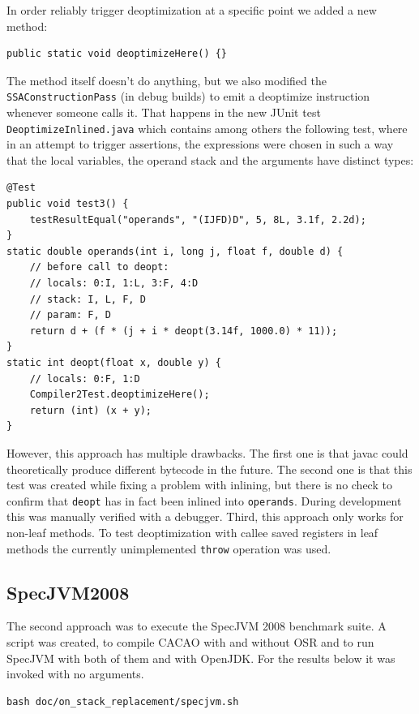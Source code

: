 \documentclass[draft,final]{vutinfth} %
\begin{document}
    In order reliably trigger deoptimization at a specific point we added a new method:

    \begin{lstlisting}
public static void deoptimizeHere() {}
    \end{lstlisting}

    The method itself doesn't do anything,
    but we also modified the \lstinline{SSAConstructionPass} (in debug builds)
    to emit a deoptimize instruction whenever someone calls it.
    That happens in the new JUnit test \lstinline{DeoptimizeInlined.java} which contains among others the following test,
    where in an attempt to trigger assertions,
    the expressions were chosen in such a way that the local variables, the operand stack and the arguments
    have distinct types:
    \begin{lstlisting}
@Test
public void test3() {
    testResultEqual("operands", "(IJFD)D", 5, 8L, 3.1f, 2.2d);
}
static double operands(int i, long j, float f, double d) {
    // before call to deopt:
    // locals: 0:I, 1:L, 3:F, 4:D
    // stack: I, L, F, D
    // param: F, D
    return d + (f * (j + i * deopt(3.14f, 1000.0) * 11));
}
static int deopt(float x, double y) {
    // locals: 0:F, 1:D
    Compiler2Test.deoptimizeHere();
    return (int) (x + y);
}
    \end{lstlisting}

    However, this approach has multiple drawbacks.
    The first one is that javac could theoretically produce different bytecode in the future.
    The second one is that this test was created while fixing a problem with inlining,
    but there is no check to confirm that \lstinline{deopt}
    has in fact been inlined into \lstinline{operands}.
    During development this was manually verified with a debugger.
    Third, this approach only works for non-leaf methods.
    To test deoptimization with callee saved registers in leaf methods the currently unimplemented \lstinline{throw} operation was used.

    \subsection{SpecJVM2008}

    The second approach was to execute the SpecJVM 2008\cite{specjvm2008} benchmark suite.
    A script was created, to compile CACAO with and without OSR and to run SpecJVM with both of them
    and with OpenJDK.
    For the results below it was invoked with no arguments.
    \begin{lstlisting}
bash doc/on_stack_replacement/specjvm.sh
    \end{lstlisting}
\end{document}
